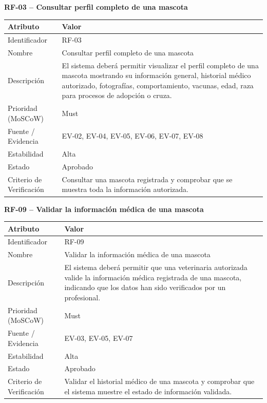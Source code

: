\documentclass[journal,onecolumn]{IEEEtran}
\begin{document}
	\textbf{RF-03 -- Consultar perfil completo de una mascota}
	\begin{table}[H]
		\centering\small
		\begin{tabularx}{\linewidth}{|l|X|}
			\hline
			\textbf{Atributo} & \textbf{Valor} \\ \hline
			Identificador & RF-03 \\ \hline
			Nombre & Consultar perfil completo de una mascota \\ \hline
			Descripción & El sistema deberá permitir visualizar el perfil completo de una mascota mostrando su información general, historial médico autorizado, fotografías, comportamiento, vacunas, edad, raza para procesos de adopción o cruza. \\ \hline
			Prioridad (MoSCoW) & Must \\ \hline
			Fuente / Evidencia & EV-02, EV-04, EV-05, EV-06, EV-07, EV-08 \\ \hline
			Estabilidad & Alta \\ \hline
			Estado & Aprobado \\ \hline
			Criterio de Verificación & Consultar una mascota registrada y comprobar que se muestra toda la información autorizada. \\ \hline
		\end{tabularx}
	\end{table}
	
	\textbf{RF-09 -- Validar la información médica de una mascota}
	\begin{table}[H]
		\centering\small
		\begin{tabularx}{\linewidth}{|l|X|}
			\hline
			\textbf{Atributo} & \textbf{Valor} \\ \hline
			Identificador & RF-09 \\ \hline
			Nombre & Validar la información médica de una mascota \\ \hline
			Descripción & El sistema deberá permitir que una veterinaria autorizada valide la información médica registrada de una mascota, indicando que los datos han sido verificados por un profesional. \\ \hline
			Prioridad (MoSCoW) & Must \\ \hline
			Fuente / Evidencia & EV-03, EV-05, EV-07 \\ \hline
			Estabilidad & Alta \\ \hline
			Estado & Aprobado \\ \hline
			Criterio de Verificación & Validar el historial médico de una mascota y comprobar que el sistema muestre el estado de información validada. \\ \hline
		\end{tabularx}
	\end{table}
	
\end{document}
